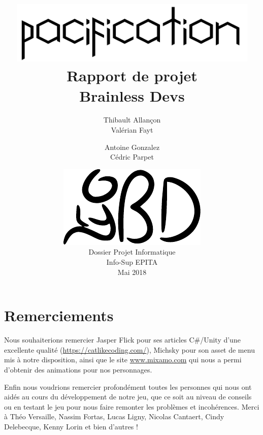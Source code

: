 \documentclass[12pt]{report}
\begin{document}
\title{
	{\vspace{3em}\protect\centering\protect\includegraphics[width=0.9\textwidth]{Pacification_logo}}\\
	{\vspace{4em}\Huge Rapport de projet}\\
	{\large Brainless Devs}
}
\author{
	Thibault Allançon\\
	Valérian Fayt
	\and
	Antoine Gonzalez\\
	Cédric Parpet}
\date{
	{\vfill\protect\centering\protect\includegraphics{brainless_devs.pdf}}\\
	Dossier Projet Informatique\\
	Info-Sup EPITA\\
	Mai 2018
}

\maketitle
\tableofcontents

\chapter{Remerciements}

Nous souhaiterions remercier Jasper Flick pour ses articles C\#/Unity d'une
excellente qualité (\url{https://catlikecoding.com/}), Michsky pour son asset de
menu mis à notre disposition, ainsi que le site \url{www.mixamo.com} qui nous a
permi d’obtenir des animations pour nos personnages.

Enfin nous voudrions remercier profondément toutes les personnes qui nous ont
aidés au cours du développement de notre jeu, que ce soit au niveau de conseils
ou en testant le jeu pour nous faire remonter les problèmes et incohérences.
Merci à Théo Versaille, Nassim Fortas, Lucas Ligny, Nicolas Cantaert, Cindy
Delebecque, Kenny Lorin et bien d'autres !
\end{document}
